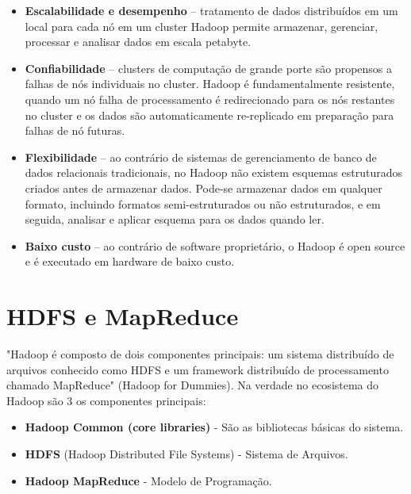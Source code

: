 \documentclass[a4paper,11pt]{article}
\begin{document}
\begin{itemize}[noitemsep]
	\item \textbf{Escalabilidade e desempenho} – tratamento de dados distribuídos em um local para cada nó em um cluster Hadoop permite armazenar, gerenciar, processar e analisar dados em escala petabyte.
	\item \textbf{Confiabilidade} – clusters de computação de grande porte são propensos a falhas de nós individuais no cluster. Hadoop é fundamentalmente resistente, quando um nó falha de processamento é redirecionado para os nós restantes no cluster e os dados são automaticamente re-replicado em preparação para falhas de nó futuras.
	\item \textbf{Flexibilidade} – ao contrário de sistemas de gerenciamento de banco de dados relacionais tradicionais, no Hadoop não existem esquemas estruturados criados antes de armazenar dados. Pode-se armazenar dados em qualquer formato, incluindo formatos semi-estruturados ou não estruturados, e em seguida, analisar e aplicar esquema para os dados quando ler.
	\item \textbf{Baixo custo} – ao contrário de software proprietário, o Hadoop é open source e é executado em hardware de baixo custo.
\end{itemize}

\section{HDFS e MapReduce}
"Hadoop é composto de dois componentes principais: um sistema distribuído de arquivos conhecido como HDFS e um framework distribuído de processamento chamado MapReduce" (Hadoop for Dummies). Na verdade no ecosistema do Hadoop são 3 os componentes principais:
\begin{itemize}[noitemsep]
	\item \textbf{Hadoop Common (core libraries)} - São as bibliotecas básicas do sistema.
	\item \textbf{HDFS} (Hadoop Distributed File Systems) - Sistema de Arquivos.
	\item \textbf{Hadoop MapReduce} - Modelo de Programação.
\end{itemize}
\end{document}
